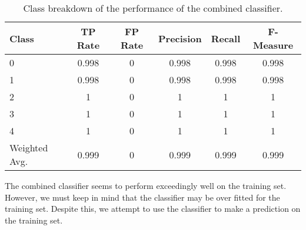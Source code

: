 \documentclass[12pt]{article}
\begin{document}
\begin{table}[h]
\centering
\begin{tabular}{|l | c c c c c|}
\hline
Class &	TP Rate & FP Rate & Precision & Recall  & F-Measure	 \\
\hline

\hline
0             &     0.998   &   0   &        0.998   &   0.998   &   0.998  \\  
1             &     0.998   &   0   &        0.998   &   0.998   &   0.998  \\ 
2             &     1       &   0   &        1       &   1       &   1      \\ 
3             &     1       &   0   &        1       &   1       &   1      \\  
4             &     1       &   0   &        1       &   1       &   1      \\  
Weighted Avg. &     0.999   &   0   &        0.999   &   0.999   &   0.999  \\ 
\hline
\end{tabular}
\caption{Class breakdown of the performance of the combined classifier.}
\label{table:combi}
\end{table}

The combined classifier seems to perform exceedingly well on the training set. However, we must keep in mind that the classifier may be over fitted for the training set. Despite this, we attempt to use the classifier to make a prediction on the training set. 
\end{document}
